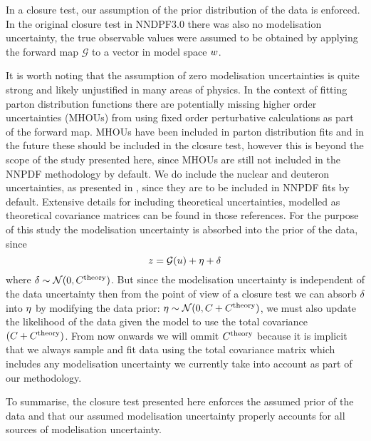 In a closure test, our assumption of the prior distribution of the data is
enforced. In the original closure test in NNDPF3.0 there was also no
modelisation uncertainty, the true observable values were assumed to be obtained
by applying the forward map $\mathcal G$ to a vector in model space $w$.

It is worth noting that the assumption of zero modelisation uncertainties is
quite strong and likely unjustified in many areas of physics. In the context of
fitting parton distribution functions there are potentially missing higher
order uncertainties (MHOUs) from
using fixed order perturbative calculations as part of the forward map.
MHOUs have been included in parton distribution fits \cite{AbdulKhalek:2019ihb}
and in the future these should be included in the closure test, however this
is beyond the scope of the study presented here, since MHOUs are still not
included in the NNPDF methodology by default. We do include the nuclear and
deuteron uncertainties, as presented in \cite{Ball:2018twp, Ball:2020xqw},
since they are to be included in NNPDF fits by default. Extensive
details for including theoretical uncertainties, modelled as theoretical covariance
matrices can be found in those references. For the purpose of this study the
modelisation uncertainty is absorbed into the prior of the data, since
\begin{equation}
    z = \mathcal{G}(u) + \eta + \delta
\end{equation}
where $\delta \sim \mathcal{N}(0, C^{\rm theory})$. But since the
modelisation uncertainty is independent of the data uncertainty then from the
point of view of a closure test we can absorb $\delta$ into $\eta$ by
modifying the data prior: $\eta \sim \mathcal{N}(0, C + C^{\rm theory})$,
we must
also update the likelihood of the data given the model to use the total
covariance $(C + C^{\rm theory})$. From now onwards we will ommit
$C^{\rm theory}$ because it is implicit that we always sample and fit data
using the total covariance matrix which includes any modelisation uncertainty
we currently take into account as part of our methodology.

To summarise, the closure test presented here enforces the assumed prior of the
data and that our assumed modelisation uncertainty properly accounts
for all sources of modelisation uncertainty.
